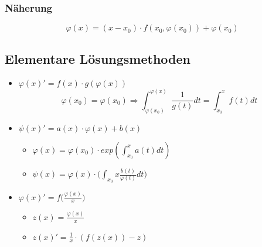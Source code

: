 \subsubsection{Näherung}
\begin{equation*}
    \varphi(x) = (x - x_0) \cdot f(x_0, \varphi(x_0)) + \varphi(x_0)
\end{equation*}

\subsection{Elementare Lösungsmethoden}
\begin{itemize}
    \item $\varphi(x)' = f(x) \cdot g(\varphi(x))$
    \begin{equation*}
        \varphi(x_0) = \varphi(x_0) \Rightarrow
        \int_{\varphi(x_0)}^{\varphi(x)} \frac{1}{g(t)} dt
        = \int_{x_0}^x f(t) dt
    \end{equation*}

    \item $ \psi(x)' = a(x) \cdot \varphi(x) + b(x)$
    \begin{itemize}
        \item $\varphi(x) = \varphi(x_0) \cdot exp(\int_{x_0}^x a(t) dt)$
        \item $\psi(x) = \varphi(x) \cdot \bigg(\int_{x_0}{x} \frac{b(t)}{\varphi(t)} dt\bigg)$
    \end{itemize}

    \item $\varphi(x)' = f\big(\frac{\varphi(x)}{x}\big)$
    \begin{itemize}
        \item $z(x) = \frac{\varphi(x)}{x}$
        \item $z(x)' = \frac{1}{x} \cdot (f(z(x)) - z)$
    \end{itemize}
\end{itemize}
